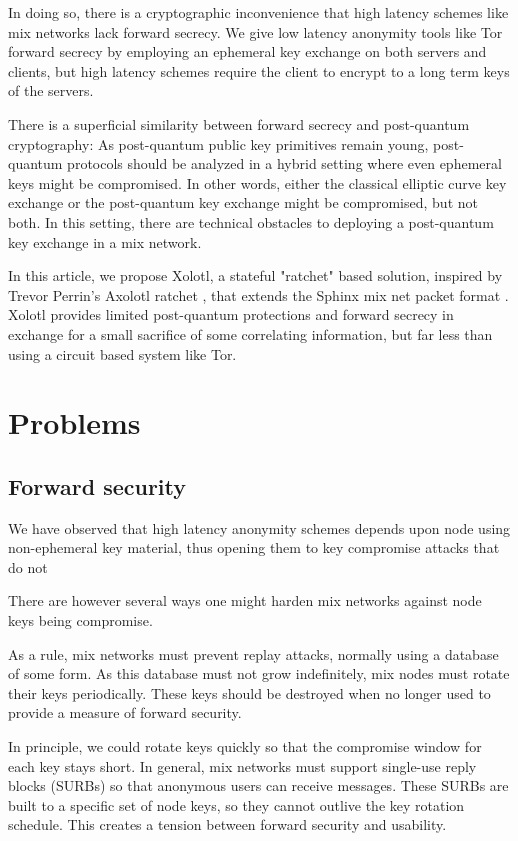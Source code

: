 \documentclass[twoside,letterpaper]{llncs}
\begin{document}
In doing so, there is a cryptographic inconvenience that high latency
schemes like mix networks lack forward secrecy.  We give low latency
anonymity tools like Tor forward secrecy by employing an ephemeral
key exchange on both servers and clients, but high latency schemes
require the client to encrypt to a long term keys of the servers.

There is a superficial similarity between forward secrecy and
post-quantum cryptography:  As post-quantum public key primitives
remain young, post-quantum protocols should be analyzed in a hybrid
setting where even ephemeral keys might be compromised.  
In other words, either the classical elliptic curve key exchange or
the post-quantum key exchange might be compromised, but not both. 
In this setting, there are technical obstacles to deploying a
post-quantum key exchange in a mix network.  

In this article, we propose Xolotl, a stateful "ratchet" based
solution, inspired by Trevor Perrin's Axolotl ratchet \cite{TextSecure},
that extends the Sphinx mix net packet format \cite{Sphinx}.
Xolotl provides limited post-quantum protections and forward secrecy
in exchange for a small sacrifice of some correlating information,
but far less than using a circuit based system like Tor.


\section{Problems} %

\subsection{Forward security}

We have observed that high latency anonymity schemes depends upon
node using non-ephemeral key material, thus opening them to key
compromise attacks that do not

There are however several ways one might harden mix networks against node
keys being compromise. 

As a rule, mix networks must prevent replay attacks, normally using
a database of some form.  As this database must not grow indefinitely,
mix nodes must rotate their keys periodically.  These keys should be
destroyed when no longer used to provide a measure of forward security.

In principle, we could rotate keys quickly so that the compromise
window for each key stays short.  In general, mix networks must
support single-use reply blocks (SURBs) so that anonymous users can
receive messages.  These SURBs are built to a specific set of node
keys, so they cannot outlive the key rotation schedule.  This creates
a tension between forward security and usability.
\end{document}
